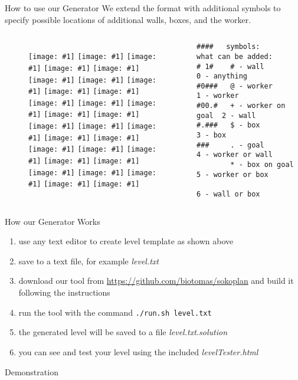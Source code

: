 \documentclass[12pt, aspectratio=169]{beamer} %
\newcommand{\sokoimg}[1]{\texttt{[image: \#1]} \hspace{-0.31em}}
\newcommand{\w}{\sokoimg{../figures/wall.pdf}}
\newcommand{\e}{\sokoimg{../figures/empty.pdf}}
\newcommand{\g}{\sokoimg{../figures/goal.pdf}}
\newcommand{\n}{\\
\vspace{-0.1em}}
\begin{document}
\begin{frame}[fragile]{How to use our Generator}
We extend the format with additional symbols to specify possible locations of additional
walls, boxes, and the worker.
\begin{columns}[c] %
\begin{figure}
\centering
\w\w\w\w\e\n
\w\e\e\w\e\n
\w\e\w\w\w\n
\w\e\e\g\w\n
\w\g\w\w\w\n
\w\w\w\e\e\n
\end{figure}

\begin{verbatim}
####   symbols:            what can be added:
# 1#    # - wall            0 - anything
#0###   @ - worker          1 - worker  
#00.#   + - worker on goal  2 - wall    
#.###   $ - box             3 - box           
###     . - goal            4 - worker or wall
        * - box on goal     5 - worker or box
                            6 - wall or box
\end{verbatim}
\end{columns}
\end{frame}

\begin{frame}{How our Generator Works}
\begin{enumerate}
\item use any text editor to create level template as shown above
\item save to a text file, for example \textit{level.txt}
\item download our tool from \url{https://github.com/biotomas/sokoplan} and build it following the instructions
\item run the tool with the command \texttt{./run.sh level.txt}
\item the generated level will be saved to a file \textit{level.txt.solution}
\item you can see and test your level using the included \textit{levelTester.html}
\end{enumerate}
\end{frame}

\begin{frame}{Demonstration}
\end{frame}
\end{document}
